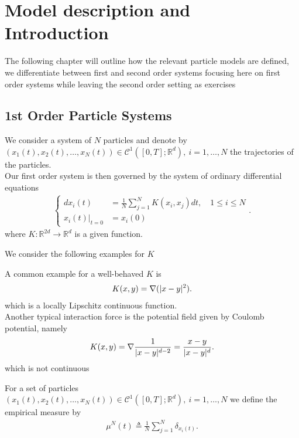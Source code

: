 \chapter{Model description and Introduction}
The following chapter will outline how the relevant particle models 
are defined, we differentiate between first and second order systems
focusing here on first order systems while leaving the second order setting
as exercises 
\section{1st Order Particle Systems}
\begin{definition}
  We consider a system of $N$ particles and denote by $(x_{1}(t),x_{2}(t),\ldots,x_N(t)) \in  \mathcal{C}^{1}([0,T];\mathbb{R}^{d} ),\ i=1,\ldots ,N $ 
  the trajectories of the particles.\\[1ex]
  Our first order system is then governed by the system of ordinary differential equations 
  \begin{align*}
    \begin{cases}
      d x_i(t) &= \frac{1}{N}\sum_{j=1}^{N} K(x_{i},x_{j}) dt, \quad 1\le i \le N  \\
        x_i(t)\rvert_{t=0} &= x_i(0)
    \end{cases}
  .\end{align*}
  where $K : \mathbb{R}^{2d} \to \mathbb{R}^{d}  $ is a given function.
\end{definition}
We consider the following examples for $K$ 
\begin{example}
A common example for a well-behaved $K$ is 
\begin{align*}
  K(x,y) =  \nabla (\lvert x-y\rvert^2)
.\end{align*}
which is a locally Lipschitz continuous function. \\[1ex]
Another typical interaction  force is the potential field given by Coulomb potential, namely 
\begin{align*}
  K(x,y) = \nabla \frac{1}{\lvert x-y\rvert^{d-2}} = \frac{x-y}{\lvert x-y\rvert^{d} }
.\end{align*}
which is not continuous
\end{example}
\begin{definition}\label{empirical_measure}
 For a set of particles\\
 $(x_{1}(t),x_{2}(t),\ldots,x_N(t)) \in  \mathcal{C}^{1}([0,T];\mathbb{R}^{d} ),\ i=1,\ldots ,N $ we define the empirical measure by 
 \begin{align*}
   \mu^{N}(t) \triangleq \frac{1}{N} \sum_{j=1}^{N} \delta_{x_i(t)} 
 .\end{align*}
\end{definition}
